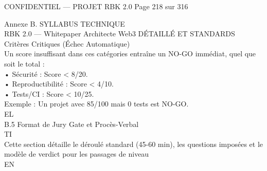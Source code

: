 \vspace{0.5em}
\vspace{0.5em}
\begin{confidential}CONFIDENTIEL — PROJET RBK 2.0                                Page 218 sur 316\end{confidential}
Annexe B. SYLLABUS TECHNIQUE\\
RBK 2.0 — Whitepaper Architecte Web3                                                                         DÉTAILLÉ ET STANDARDS\\
\vspace{0.5em}
\vspace{0.5em}
\vspace{0.5em}
Critères Critiques (Échec Automatique)\\
\vspace{0.5em}
Un score insuffisant dans ces catégories entraîne un NO-GO immédiat, quel que soit le total :\\
\vspace{0.5em}
• Sécurité : Score \textless{} 8/20.\\
\vspace{0.5em}
• Reproductibilité : Score \textless{} 4/10.\\
\vspace{0.5em}
• Tests/CI : Score \textless{} 10/25.\\
\vspace{0.5em}
Exemple : Un projet avec 85/100 mais 0 tests est NO-GO.\\
\vspace{0.5em}
\vspace{0.5em}
\vspace{0.5em}
\vspace{0.5em}
EL\\
B.5 Format de Jury Gate et Procès-Verbal\\
\vspace{0.5em}
\vspace{0.5em}
\vspace{0.5em}
\vspace{0.5em}
TI\\
Cette section détaille le déroulé standard (45-60 min), les questions imposées et le modèle de verdict pour les passages de niveau\\
\vspace{0.5em}
\vspace{0.5em}
\vspace{0.5em}
\vspace{0.5em}
EN\\
